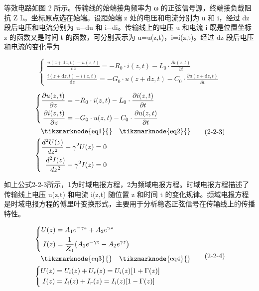 等效电路如图 2 所示。传输线的始端接角频率为 ω 的正弦信号源，终端接负载阻抗 Z 
L。坐标原点选在始端。设距始端 z 处的电压和电流分别为 u 和 i，经过 dz 段后电压和电流分别为 u−du 和 i−di。传输线上的电压 u 和电流 i 既是位置坐标 z 的函数又是时间 t 的函数，可分别表示为 u=u(z,t)，i=i(z,t)。经过 dz 段后电压和电流的变化量为


\begin{equation}
	\begin{cases}
		\displaystyle \frac{u(z + \mathrm{d}z, t) - u(z, t)}{\mathrm{d}z} = -R_0 \cdot i(z, t) - L_0 \cdot \frac{\partial i(z, t)}{\partial t} \\[12pt]
		\displaystyle \frac{i(z + \mathrm{d}z, t) - i(z, t)}{\mathrm{d}z} = -G_0 \cdot u(z + \mathrm{d}z, t) - C_0 \cdot \frac{\partial u(z + \mathrm{d}z, t)}{\partial t}
	\end{cases}
	\tag{2}
\end{equation}


\begin{equation}
	\begin{aligned}
		& \left\{
		\begin{aligned}
			\frac{\partial u(z, t)}{\partial z} &= -R_0 \cdot i(z, t) - L_0 \cdot \frac{\partial i(z, t)}{\partial t} \\
			\frac{\partial i(z, t)}{\partial z} &= -G_0 \cdot u(z, t) - C_0 \cdot \frac{\partial u(z, t)}{\partial t}
		\end{aligned}
		\right. \\
		& \quad \text{\tikzmarknode{eq1}{}} \quad \text{\tikzmarknode{eq2}{}} \\
		& \left\{
		\begin{aligned}
			\frac{d^2 U(z)}{dz^2} - \gamma^2 U(z) &= 0 \\
			\frac{d^2 I(z)}{dz^2} - \gamma^2 I(z) &= 0
		\end{aligned}
		\right.
	\end{aligned}
	\tag{2-2-3}
\end{equation}

如上公式2-2-3所示，1为时域电报方程，2为频域电报方程。时域电报方程描述了传输线上电压 u(z,t) 和电流 i(z,t) 随位置 z 和时间 t 的变化规律。频域电报方程是时域电报方程的傅里叶变换形式，主要用于分析稳态正弦信号在传输线上的传播特性。

\begin{equation}
	\begin{aligned}
		& \left\{
		\begin{aligned}
			U(z) &= A_1 e^{-\gamma z} + A_2 e^{\gamma z} \\
			I(z) &= \frac{1}{Z_0} \big( A_1 e^{-\gamma z} - A_2 e^{\gamma z} \big)
		\end{aligned}
		\right. \\
		& \quad \text{\tikzmarknode{eq3}{}} \quad \text{\tikzmarknode{eq4}{}} \\
		& \left\{
		\begin{aligned}
			U(z) &= U_i(z) + U_r(z) = U_i(z) [1 + \Gamma(z)] \\
			I(z) &= I_i(z) + I_r(z) = I_i(z) [1 - \Gamma(z)]
		\end{aligned}
		\right.
	\end{aligned}
	\tag{2-2-4}
\end{equation}

